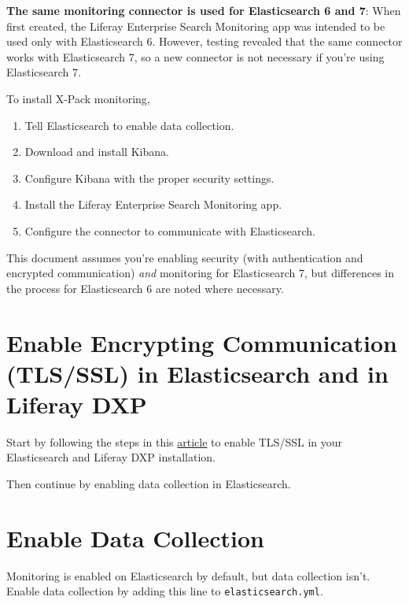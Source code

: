 \noindent\hrulefill

\textbf{The same monitoring connector is used for Elasticsearch 6 and
7}: When first created, the Liferay Enterprise Search Monitoring app was
intended to be used only with Elasticsearch 6. However, testing revealed
that the same connector works with Elasticsearch 7, so a new connector
is not necessary if you're using Elasticsearch 7.

\noindent\hrulefill

To install X-Pack monitoring,

\begin{enumerate}
\def\labelenumi{\arabic{enumi}.}
\item
  Tell Elasticsearch to enable data collection.
\item
  Download and install Kibana.
\item
  Configure Kibana with the proper security settings.
\item
  Install the Liferay Enterprise Search Monitoring app.
\item
  Configure the connector to communicate with Elasticsearch.
\end{enumerate}

This document assumes you're enabling security (with authentication and
encrypted communication) \emph{and} monitoring for Elasticsearch 7, but
differences in the process for Elasticsearch 6 are noted where
necessary.

\section{Enable Encrypting Communication (TLS/SSL) in Elasticsearch and
in Liferay
DXP}\label{enable-encrypting-communication-tlsssl-in-elasticsearch-and-in-liferay-dxp}

Start by following the steps in this
\href{/docs/7-2/deployment/-/knowledge_base/u/installing-liferay-enterprise-search-security}{article}
to enable TLS/SSL in your Elasticsearch and Liferay DXP installation.

Then continue by enabling data collection in Elasticsearch.

\section{Enable Data Collection}\label{enable-data-collection}

Monitoring is enabled on Elasticsearch by default, but data collection
isn't. Enable data collection by adding this line to
\texttt{elasticsearch.yml}.

